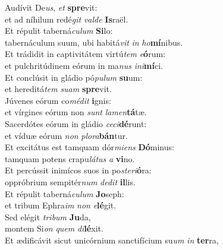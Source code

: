 \oddverse Audívit De\textit{us}, \textit{et} \textbf{spre}vit:~\*\\
\oddverse et ad níhilum redé\textit{git} \textit{val}\textit{de} \textbf{Is}raël.\\
\evenverse Et répulit taberná\textit{cu}\textit{lum} \textbf{Si}lo:~\*\\
\evenverse tabernáculum suum, ubi habitá\textit{vit} \textit{in} \textit{ho}\textbf{mí}nibus.\\
\oddverse Et trádidit in captivitátem virtú\textit{tem} \textit{e}\textbf{ó}rum:~\*\\
\oddverse et pulchritúdinem eórum in ma\textit{nus} \textit{i}\textit{ni}\textbf{mí}ci.\\
\evenverse Et conclúsit in gládio pó\textit{pu}\textit{lum} \textbf{su}um:~\*\\
\evenverse et hereditá\textit{tem} \textit{su}\textit{am} \textbf{spre}vit.\\
\oddverse Júvenes eórum co\textit{mé}\textit{dit} \textbf{i}gnis:~\*\\
\oddverse et vírgines eórum non \textit{sunt} \textit{la}\textit{men}\textbf{tá}tæ.\\
\evenverse Sacerdótes eórum in gládio \textit{ce}\textit{ci}\textbf{dé}runt:~\*\\
\evenverse et víduæ eórum \textit{non} \textit{plo}\textit{ra}\textbf{bán}tur.\\
\oddverse Et excitátus est tamquam dór\textit{mi}\textit{ens} \textbf{Dó}minus:~\*\\
\oddverse tamquam potens crapu\textit{lá}\textit{tus} \textit{a} \textbf{vi}no.\\
\evenverse Et percússit inimícos suos in po\textit{ste}\textit{ri}\textbf{ó}ra:~\*\\
\evenverse oppróbrium sempitér\textit{num} \textit{de}\textit{dit} \textbf{il}lis.\\
\oddverse Et répulit taberná\textit{cu}\textit{lum} \textbf{Jo}seph:~\*\\
\oddverse et tribum Ephra\textit{im} \textit{non} \textit{e}\textbf{lé}git.\\
\evenverse Sed elégit \textit{tri}\textit{bum} \textbf{Ju}da,~\*\\
\evenverse montem Si\textit{on} \textit{quem} \textit{di}\textbf{lé}xit.\\
\oddverse Et ædificávit sicut unicórnium sanctifícium su\textit{um} \textit{in} \textbf{ter}ra,~\*\\
